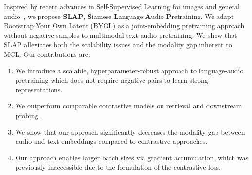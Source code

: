 \documentclass{article}
\newcommand*\circled[1]{\tikz[baseline=(char.base)]{
            \node[shape=circle,draw,inner sep=2pt] (char) {#1};}}
\begin{document}
Inspired by recent advances in Self-Supervised Learning for images and general audio~\cite{grill2020bootstrap,niizumi2021byol},
we propose \textbf{SLAP}, \textbf{S}iamese \textbf{L}anguage \textbf{A}udio \textbf{P}retraining.
We adapt Bootstrap Your Own Latent (BYOL) \cite{grill2020bootstrap} as a joint-embedding pretraining approach without negative samples to multimodal text-audio pretraining.
We show that SLAP alleviates both
the scalability issues
and the modality gap inherent to MCL. Our contributions are:





\begin{enumerate}%
\item We introduce a scalable, hyperparameter-robust approach to language-audio pretraining which does not require negative pairs to learn strong representations.
\item We outperform comparable contrastive models on retrieval and downstream probing.
\item We show that our approach significantly decreases the modality gap between audio and text embeddings compared to contrastive approaches.
\item Our approach enables larger batch sizes via gradient accumulation, which was previously inaccessible due to the formulation of the contrastive loss.
\end{enumerate}
\end{document}
